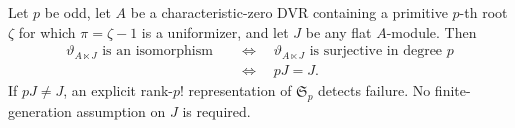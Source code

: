 \begin{theorem}
\label{C:cyclotomic_flat_criterion}
Let $p$ be odd, let $A$ be a characteristic-zero DVR containing a
primitive $p$-th root $\zeta$ for which $\pi=\zeta-1$ is a
uniformizer, and let $J$ be any flat $A$-module. Then
\[
 \begin{aligned}
 \vartheta_{A\ltimes J}\text{ is an isomorphism}
 &\quad\Longleftrightarrow\quad
 \vartheta_{A\ltimes J}\text{ is surjective in degree }p\\
 &\quad\Longleftrightarrow\quad pJ=J.
 \end{aligned}
\]
If $pJ\ne J$, an explicit rank-$p!$ representation of
$\mathfrak S_p$ detects failure. No finite-generation assumption
on $J$ is required.
\end{theorem}
